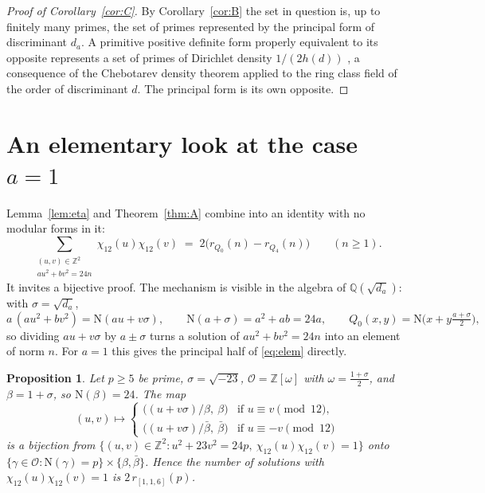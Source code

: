 \documentclass[11pt]{amsart}
\newtheorem{proposition}[lemma]{Proposition}
\theoremstyle{definition}
\theoremstyle{remark}
\newcommand{\Z}{\mathbb{Z}}
\newcommand{\Q}{\mathbb{Q}}
\begin{document}
\begin{proof}[Proof of Corollary~\ref{cor:C}]
By Corollary~\ref{cor:B} the set in question is, up to finitely many primes, the set of primes represented by the principal form of discriminant $d_a$. A primitive positive definite form properly equivalent to its opposite represents a set of primes of Dirichlet density $1/(2h(d))$ \cite[Thm.~9.12]{Cox}, a consequence of the Chebotarev density theorem applied to the ring class field of the order of discriminant $d$. The principal form is its own opposite.
\end{proof}

\section{An elementary look at the case \texorpdfstring{$a=1$}{a=1}}\label{sec:elem}

Lemma~\ref{lem:eta} and Theorem~\ref{thm:A} combine into an identity with no modular forms in it:
\begin{equation}\label{eq:elem}
\sum_{\substack{(u,v)\in\Z^2\\ au^2+bv^2=24n}}\chi_{12}(u)\chi_{12}(v)\;=\;2\bigl(r_{Q_0}(n)-r_{Q_4}(n)\bigr)\qquad(n\ge1).
\end{equation}
It invites a bijective proof. The mechanism is visible in the algebra of $\Q(\sqrt{d_a})$: with $\sigma=\sqrt{d_a}$,
\[
a\,(au^2+bv^2)=\mathrm{N}(au+v\sigma),\qquad \mathrm{N}(a+\sigma)=a^2+ab=24a,\qquad Q_0(x,y)=\mathrm{N}\bigl(x+y\tfrac{a+\sigma}{2}\bigr),
\]
so dividing $au+v\sigma$ by $a\pm\sigma$ turns a solution of $au^2+bv^2=24n$ into an element of norm $n$. For $a=1$ this gives the principal half of \eqref{eq:elem} directly.

\begin{proposition}\label{prop:a1}
Let $p\ge5$ be prime, $\sigma=\sqrt{-23}$, $\mathcal O=\Z[\omega]$ with $\omega=\frac{1+\sigma}{2}$, and $\beta=1+\sigma$, so $\mathrm{N}(\beta)=24$. The map
\[
(u,v)\longmapsto\begin{cases}\bigl((u+v\sigma)/\beta,\ \beta\bigr)&\text{if }u\equiv v\pmod{12},\\ \bigl((u+v\sigma)/\bar\beta,\ \bar\beta\bigr)&\text{if }u\equiv -v\pmod{12}\end{cases}
\]
is a bijection from $\{(u,v)\in\Z^2:u^2+23v^2=24p,\ \chi_{12}(u)\chi_{12}(v)=1\}$ onto $\{\gamma\in\mathcal O:\mathrm N(\gamma)=p\}\times\{\beta,\bar\beta\}$. Hence the number of solutions with $\chi_{12}(u)\chi_{12}(v)=1$ is $2\,r_{[1,1,6]}(p)$.
\end{proposition}
\end{document}
